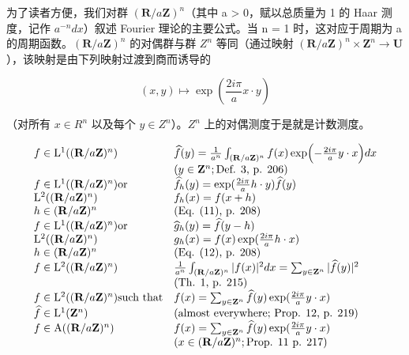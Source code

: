 
为了读者方便，我们对群 \((\mathbf{R}/a\mathbf{Z})^{n}\)（其中 a \textgreater{} 0，赋以总质量为 1 的 Haar 测度，记作 \(a^{-n} dx\)）叙述 Fourier 理论的主要公式。当 n = 1 时，这对应于周期为 a 的周期函数。\((\mathbf{R}/a\mathbf{Z})^{n}\) 的对偶群与群 \(Z^{n}\) 等同（通过映射 \((\mathbf{R}/a\mathbf{Z})^{n} \times \mathbf{Z}^{n} \to \mathbf{U}\)），该映射是由下列映射过渡到商而诱导的

\[
(x, y) \mapsto \exp \left(\frac {2 i \pi}{a} x \cdot y\right)
\]

（对所有 \(x \in R^{n}\) 以及每个 \(y \in Z^{n}\)）。\(Z^{n}\) 上的对偶测度于是就是计数测度。

\[
\begin{array}{l l} f \in \mathrm{L} ^ {1} ((\mathbf {R} / a \mathbf {Z}) ^ {n}) & \widehat {f} (y) = \frac {1}{a ^ {n}} \int_ {(\mathbf {R} / a \mathbf {Z}) ^ {n}} f (x) \exp \Bigl (- \frac {2 i \pi}{a} y \cdot x \Bigr) d x \\ & (y \in \mathbf {Z} ^ {n}; \text {Def. 3, p. 206}) \\ f \in \mathrm{L} ^ {1} ((\mathbf {R} / a \mathbf {Z}) ^ {n}) \text {or} & \widehat {f} _ {h} (y) = \exp (\frac {2 i \pi}{a} h \cdot y) \widehat {f} (y) \\ \mathrm{L} ^ {2} ((\mathbf {R} / a \mathbf {Z}) ^ {n}) & f _ {h} (x) = f (x + h) \\ h \in (\mathbf {R} / a \mathbf {Z}) ^ {n} & (\text {Eq. (11), p. 208}) \\ f \in \mathrm{L} ^ {1} ((\mathbf {R} / a \mathbf {Z}) ^ {n}) \text {or} & \widehat {g} _ {h} (y) = \widehat {f} (y - h) \\ \mathrm{L} ^ {2} ((\mathbf {R} / a \mathbf {Z}) ^ {n}) & g _ {h} (x) = f (x) \exp (\frac {2 i \pi}{a} h \cdot x) \\ h \in (\mathbf {R} / a \mathbf {Z}) ^ {n} & (\text {Eq. (12), p. 208}) \\ f \in \mathrm{L} ^ {2} ((\mathbf {R} / a \mathbf {Z}) ^ {n}) & \frac {1}{a ^ {n}} \int_ {(\mathbf {R} / a \mathbf {Z}) ^ {n}} | f (x) | ^ {2} d x = \sum_ {y \in \mathbf {Z} ^ {n}} | \widehat {f} (y) | ^ {2} \\ & (\text {Th. 1, p. 215}) \\ f \in \mathrm{L} ^ {2} ((\mathbf {R} / a \mathbf {Z}) ^ {n}) \text {such that} & f (x) = \sum_ {y \in \mathbf {Z} ^ {n}} \widehat {f} (y) \exp (\frac {2 i \pi}{a} y \cdot x) \\ \widehat {f} \in \mathrm{L} ^ {1} (\mathbf {Z} ^ {n}) & (\text {almost everywhere; Prop. 12, p. 219}) \\ f \in \mathrm{A} ((\mathbf {R} / a \mathbf {Z}) ^ {n}) & f (x) = \sum_ {y \in \mathbf {Z} ^ {n}} \widehat {f} (y) \exp (\frac {2 i \pi}{a} y \cdot x) \\ & (x \in (\mathbf {R} / a \mathbf {Z}) ^ {n}; \text {Prop. 11 p. 217}) \end{array}
\]


